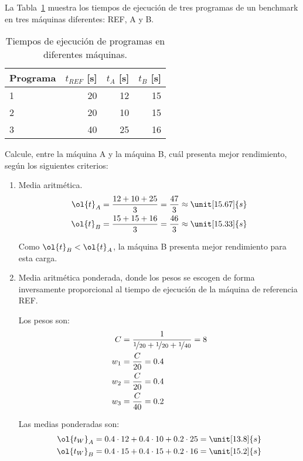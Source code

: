 \begin{ejercicio}\label{ej:4.4}
La Tabla~\ref{tab:ej:4.4} muestra los tiempos de ejecución de tres programas de un benchmark en tres máquinas diferentes: REF, A y B.
\begin{table}[h]
\centering
\begin{tabular}{@{}lrrr@{}}
\toprule
Programa & $t_{REF}$ [s] & $t_A$ [s] & $t_B$ [s] \\ \midrule
1 & 20 & 12 & 15 \\
2 & 20 & 10 & 15 \\
3 & 40 & 25 & 16 \\ \bottomrule
\end{tabular}
\caption{Tiempos de ejecución de programas en diferentes máquinas.}
\label{tab:ej:4.4}
\end{table}

Calcule, entre la máquina A y la máquina B, cuál presenta mejor rendimiento, según los siguientes criterios:
\begin{enumerate}
    \item Media aritmética.
    \begin{align*}
        \ol{t}_A &= \dfrac{12 + 10 + 25}{3} = \dfrac{47}{3} \approx \unit[15.67]{s}\\
        \ol{t}_B &= \dfrac{15 + 15 + 16}{3} = \dfrac{46}{3} \approx \unit[15.33]{s}
    \end{align*}

    Como $\ol{t}_B < \ol{t}_A$, la máquina B presenta mejor rendimiento para esta carga.
    

    \item Media aritmética ponderada, donde los pesos se escogen de forma inversamente proporcional al tiempo de ejecución de la máquina de referencia REF.

    Los pesos son:
    \begin{align*}
        C &= \dfrac{1}{\nicefrac{1}{20}+\nicefrac{1}{20}+\nicefrac{1}{40}} = 8\\
        w_1 &= \frac{C}{20} = 0.4\\
        w_2 &= \frac{C}{20} = 0.4\\
        w_3 &= \frac{C}{40} = 0.2
    \end{align*}

    Las medias ponderadas son:
    \begin{align*}
        \ol{t_W}_A &= 0.4\cdot 12 + 0.4\cdot 10 + 0.2\cdot 25 = \unit[13.8]{s}\\
        \ol{t_W}_B &= 0.4\cdot 15 + 0.4\cdot 15 + 0.2\cdot 16 = \unit[15.2]{s}
    \end{align*}
    

\end{enumerate}
\end{ejercicio}
